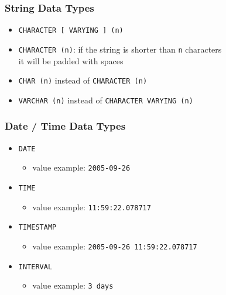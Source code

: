 \documentclass[dvipsnames]{beamer}
\theoremstyle{plain}
\begin{document}
\begin{frame}
  \frametitle{String Data Types}

  \begin{itemize}
    \item \texttt{CHARACTER [ VARYING ] (n)}
    \item \texttt{CHARACTER (n)}: if the string is shorter than
      \texttt{n} characters\\
      it will be padded with spaces

    \medskip
    \item \texttt{CHAR (n)} instead of \texttt{CHARACTER (n)}
    \item \texttt{VARCHAR (n)} instead of \texttt{CHARACTER VARYING (n)}
  \end{itemize}
\end{frame}

\begin{frame}
  \frametitle{Date / Time Data Types}

  \begin{itemize}
    \item \texttt{DATE}
    \begin{itemize}
      \item value example: \texttt{2005-09-26}
    \end{itemize}

    \medskip
    \item \texttt{TIME}
    \begin{itemize}
      \item value example: \texttt{11:59:22.078717}
    \end{itemize}

    \medskip
    \item \texttt{TIMESTAMP}
    \begin{itemize}
      \item value example: \texttt{2005-09-26 11:59:22.078717}
    \end{itemize}

    \medskip
    \item \texttt{INTERVAL}
    \begin{itemize}
      \item value example: \texttt{3 days}
    \end{itemize}
  \end{itemize}
\end{frame}
\end{document}
